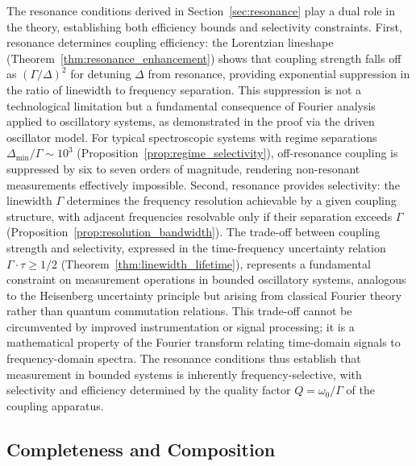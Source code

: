 \documentclass[twocolumn,10pt,a4paper]{article}
\theoremstyle{remark}
\begin{document}
The resonance conditions derived in Section~\ref{sec:resonance} play a dual role in the theory, establishing both efficiency bounds and selectivity constraints. First, resonance determines coupling efficiency: the Lorentzian lineshape (Theorem~\ref{thm:resonance_enhancement}) shows that coupling strength falls off as $(\Gamma/\Delta)^2$ for detuning $\Delta$ from resonance, providing exponential suppression in the ratio of linewidth to frequency separation. This suppression is not a technological limitation but a fundamental consequence of Fourier analysis applied to oscillatory systems, as demonstrated in the proof via the driven oscillator model. For typical spectroscopic systems with regime separations $\Delta_{\min}/\Gamma \sim 10^3$ (Proposition~\ref{prop:regime_selectivity}), off-resonance coupling is suppressed by six to seven orders of magnitude, rendering non-resonant measurements effectively impossible. Second, resonance provides selectivity: the linewidth $\Gamma$ determines the frequency resolution achievable by a given coupling structure, with adjacent frequencies resolvable only if their separation exceeds $\Gamma$ (Proposition~\ref{prop:resolution_bandwidth}). The trade-off between coupling strength and selectivity, expressed in the time-frequency uncertainty relation $\Gamma \cdot \tau \geq 1/2$ (Theorem~\ref{thm:linewidth_lifetime}), represents a fundamental constraint on measurement operations in bounded oscillatory systems, analogous to the Heisenberg uncertainty principle but arising from classical Fourier theory rather than quantum commutation relations. This trade-off cannot be circumvented by improved instrumentation or signal processing; it is a mathematical property of the Fourier transform relating time-domain signals to frequency-domain spectra. The resonance conditions thus establish that measurement in bounded systems is inherently frequency-selective, with selectivity and efficiency determined by the quality factor $Q = \omega_0/\Gamma$ of the coupling apparatus.

\subsection{Completeness and Composition}
\end{document}
